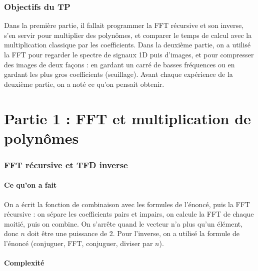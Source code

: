 \documentclass[11pt,a4paper]{article}
\begin{document}
\tableofcontents
\newpage
{}


\section{Objectifs du TP}

Dans la première partie, il fallait programmer la FFT récursive et son inverse, s'en
servir pour multiplier des polynômes, et comparer le temps de calcul avec la
multiplication classique par les coefficients. Dans la deuxième partie, on a utilisé
la FFT pour regarder le spectre de signaux 1D puis d'images, et pour compresser des
images de deux façons : en gardant un carré de basses fréquences ou en gardant les
plus gros coefficients (seuillage). Avant chaque expérience de la deuxième partie,
on a noté ce qu'on pensait obtenir.

\part*{Partie 1 : FFT et multiplication de polynômes}

\section{FFT récursive et TFD inverse}

\subsection{Ce qu'on a fait}

On a écrit la fonction de combinaison avec les formules de l'énoncé, puis la FFT
récursive : on sépare les coefficients pairs et impairs, on calcule la FFT de chaque
moitié, puis on combine. On s'arrête quand le vecteur n'a plus qu'un élément, donc
$n$ doit être une puissance de 2. Pour l'inverse, on a utilisé la formule de
l'énoncé (conjuguer, FFT, conjuguer, diviser par $n$).

\subsection{Complexité}
\end{document}
